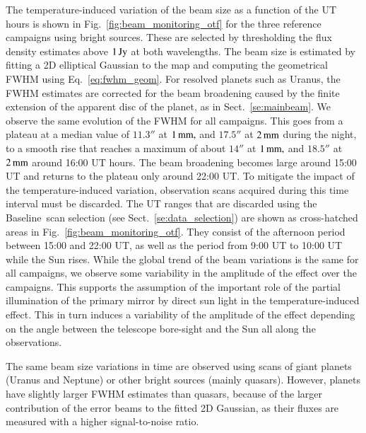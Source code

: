 \documentclass[traditionalabstract]{aa}
\newcommand{\baseline}{Baseline}%
\newcommand{\lp}[1]{#1}
\begin{document}
{The temperature-induced variation of the beam size as a function of
the UT hours is shown in Fig.~\ref{fig:beam_monitoring_otf} for the
three reference campaigns using bright sources. These are
selected by thresholding the flux density estimates above $1\,\rm{Jy}$
at both wavelengths. The beam size is estimated by fitting a 2D
elliptical Gaussian to the map {\lp and computing the geometrical FWHM
using Eq.~\ref{eq:fwhm_geom}.} For resolved planets such as Uranus, the
FWHM estimates are corrected for the beam broadening caused by the finite
extension of the apparent disc of the planet, as in
Sect.~\ref{se:mainbeam}.
We observe the same evolution of
the FWHM for all campaigns. 
This goes from a plateau at a median value of $11.3''$ at $1\,\rm{mm,}$
and $17.5''$ at $2\,\rm{mm}$ during the night, to a smooth rise that
reaches a maximum of about $14''$ at $1\,\rm{mm,}$ and $18.5''$ at
$2\,\rm{mm}$ around 16:00 UT hours. The beam broadening becomes large
around 15:00 UT and returns to the plateau only around 22:00 UT.
To mitigate the impact of the temperature-induced variation,
observation scans acquired during this time interval must be
discarded. The UT ranges that are discarded
using the \baseline\ scan selection (see
Sect.~\ref{se:data_selection}) are shown as cross-hatched areas in
Fig.~\ref{fig:beam_monitoring_otf}.
They consist of the afternoon
period between 15:00 and 22:00 UT, as well as the period from 9:00 UT to 10:00 UT while the Sun
rises. 
{\lp While the global trend of the beam variations is the
same for all campaigns, we observe some variability in the amplitude
of the effect over the campaigns. This supports the assumption of the
important role of the partial illumination of the primary mirror by
direct sun light in the temperature-induced effect. This in turn
induces a variability of the amplitude of the effect depending on the
angle between the telescope bore-sight %
and the Sun all along the
observations.}

The same beam size variations in time are observed using scans of giant planets
(Uranus and Neptune) or other bright
sources (mainly quasars). However, planets have slightly larger FWHM
estimates than quasars, because of
the larger contribution of the error beams to the fitted 2D Gaussian,
as their fluxes are measured with a higher signal-to-noise ratio.


%

}
\end{document}
